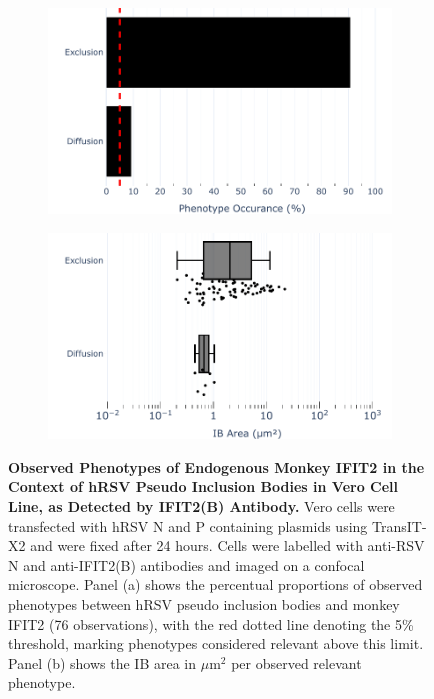 \begin{figure}
    \begin{subfigure}{0.495\textwidth}
        \caption{}
        \includegraphics[width=1\linewidth]{09. Chapter 4/Figs/01. pIB/03. IFIT2/03. IFIT2B/04. bar_i2b_vero_hnhp.pdf} 
    \end{subfigure}
    \begin{subfigure}{0.495\textwidth}
        \caption{}
        \includegraphics[width=1\linewidth]{09. Chapter 4/Figs/01. pIB/03. IFIT2/03. IFIT2B/05. box_i2b_vero_hnhp.pdf}
    \end{subfigure}
    \caption[Observed Phenotypes of Endogenous Monkey IFIT2 in the Context of hRSV Pseudo Inclusion Bodies in Vero Cell Line, as Detected by IFIT2(B) Antibody.]{\textbf{Observed Phenotypes of Endogenous Monkey IFIT2 in the Context of hRSV Pseudo Inclusion Bodies in Vero Cell Line, as Detected by IFIT2(B) Antibody.} Vero cells were transfected with hRSV N and P containing plasmids using TransIT-X2 and were fixed after 24 hours. Cells were labelled with anti-RSV N and anti-IFIT2(B) antibodies and imaged on a confocal microscope. Panel (a) shows the percentual proportions of observed phenotypes between hRSV pseudo inclusion bodies and monkey IFIT2 (76 observations), with the red dotted line denoting the 5\% threshold, marking phenotypes considered relevant above this limit. Panel (b) shows the IB area in \(\mu \mbox{m}^2\) per observed relevant phenotype.}
    \label{fig:Observed Phenotypes of Endogenous Monkey IFIT2 in the Context of hRSV Pseudo Inclusion Bodies in Vero Cell Line, as Detected by IFIT2(B) Antibody}
\end{figure}

